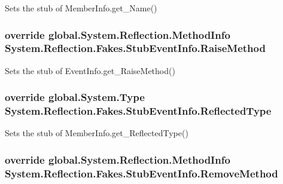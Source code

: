 Sets the stub of Member\-Info.\-get\-\_\-\-Name()

\hypertarget{class_system_1_1_reflection_1_1_fakes_1_1_stub_event_info_aafa6782791af63626591dbc06f1e1ea6}{
\subsubsection[{Raise\-Method}]{\setlength{\rightskip}{0pt plus 5cm}override global.\-System.\-Reflection.\-Method\-Info System.\-Reflection.\-Fakes.\-Stub\-Event\-Info.\-Raise\-Method\hspace{0.3cm}{\ttfamily [get]}}}\label{class_system_1_1_reflection_1_1_fakes_1_1_stub_event_info_aafa6782791af63626591dbc06f1e1ea6}


Sets the stub of Event\-Info.\-get\-\_\-\-Raise\-Method()

\hypertarget{class_system_1_1_reflection_1_1_fakes_1_1_stub_event_info_a944cbb86a2a5fe9bfe55a9bf6ad0365e}{
\subsubsection[{Reflected\-Type}]{\setlength{\rightskip}{0pt plus 5cm}override global.\-System.\-Type System.\-Reflection.\-Fakes.\-Stub\-Event\-Info.\-Reflected\-Type\hspace{0.3cm}{\ttfamily [get]}}}\label{class_system_1_1_reflection_1_1_fakes_1_1_stub_event_info_a944cbb86a2a5fe9bfe55a9bf6ad0365e}


Sets the stub of Member\-Info.\-get\-\_\-\-Reflected\-Type()

\hypertarget{class_system_1_1_reflection_1_1_fakes_1_1_stub_event_info_a40dbe0424db9e5822a48696958c38ba6}{
\subsubsection[{Remove\-Method}]{\setlength{\rightskip}{0pt plus 5cm}override global.\-System.\-Reflection.\-Method\-Info System.\-Reflection.\-Fakes.\-Stub\-Event\-Info.\-Remove\-Method\hspace{0.3cm}{\ttfamily [get]}}}\label{class_system_1_1_reflection_1_1_fakes_1_1_stub_event_info_a40dbe0424db9e5822a48696958c38ba6}


